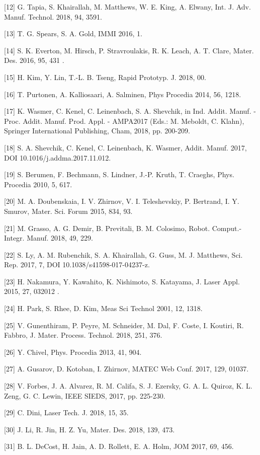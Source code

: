 \documentclass[10pt]{article}
\begin{document}
[12] G. Tapia, S. Khairallah, M. Matthews, W. E. King, A. Elwany, Int. J. Adv. Manuf. Technol. 2018, 94, 3591.

[13] T. G. Spears, S. A. Gold, IMMI 2016, 1.

[14] S. K. Everton, M. Hirsch, P. Stravroulakis, R. K. Leach, A. T. Clare, Mater. Des. 2016, 95, 431 .

[15] H. Kim, Y. Lin, T.-L. B. Tseng, Rapid Prototyp. J. 2018, 00.

[16] T. Purtonen, A. Kalliosaari, A. Salminen, Phys Procedia 2014, 56, 1218.

[17] K. Wasmer, C. Kenel, C. Leinenbach, S. A. Shevchik, in Ind. Addit. Manuf. - Proc. Addit. Manuf. Prod. Appl. - AMPA2017 (Eds.: M. Meboldt, C. Klahn), Springer International Publishing, Cham, 2018, pp. 200-209.

[18] S. A. Shevchik, C. Kenel, C. Leinenbach, K. Wasmer, Addit. Manuf. 2017, DOI 10.1016/j.addma.2017.11.012.

[19] S. Berumen, F. Bechmann, S. Lindner, J.-P. Kruth, T. Craeghs, Phys. Procedia 2010, 5, 617.

[20] M. A. Doubenskaia, I. V. Zhirnov, V. I. Teleshevskiy, P. Bertrand, I. Y. Smurov, Mater. Sci. Forum 2015, 834, 93.

[21] M. Grasso, A. G. Demir, B. Previtali, B. M. Colosimo, Robot. Comput.-Integr. Manuf. 2018, 49, 229.

[22] S. Ly, A. M. Rubenchik, S. A. Khairallah, G. Guss, M. J. Matthews, Sci. Rep. 2017, 7, DOI 10.1038/s41598-017-04237-z.

[23] H. Nakamura, Y. Kawahito, K. Nishimoto, S. Katayama, J. Laser Appl. 2015, 27, 032012 .

[24] H. Park, S. Rhee, D. Kim, Meas Sci Technol 2001, 12, 1318.

[25] V. Gunenthiram, P. Peyre, M. Schneider, M. Dal, F. Coste, I. Koutiri, R. Fabbro, J. Mater. Process. Technol. 2018, 251, 376.

[26] Y. Chivel, Phys. Procedia 2013, 41, 904.

[27] A. Gusarov, D. Kotoban, I. Zhirnov, MATEC Web Conf. 2017, 129, 01037.

[28] V. Forbes, J. A. Alvarez, R. M. Califa, S. J. Ezersky, G. A. L. Quiroz, K. L. Zeng, G. C. Lewin, IEEE SIEDS, 2017, pp. 225-230.

[29] C. Dini, Laser Tech. J. 2018, 15, 35.

[30] J. Li, R. Jin, H. Z. Yu, Mater. Des. 2018, 139, 473.

[31] B. L. DeCost, H. Jain, A. D. Rollett, E. A. Holm, JOM 2017, 69, 456.
\end{document}
